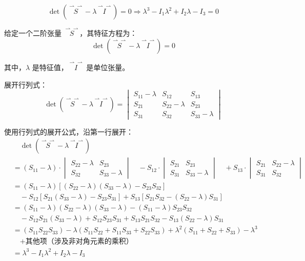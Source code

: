 \documentclass[12pt, a4paper, oneside, UTF8]{ctexbook}  %
\newcommand{\vvec}{\overset{\rightharpoonup\!\!\!\! \rightharpoonup}}
\begin{document}
\begin{lemma}
    \[\det\left(\vvec{S}-\lambda\vvec{I}\right)=0\Rightarrow
    \lambda^3-I_1\lambda^2+I_2\lambda-I_3=0\]
    \begin{tui}
        给定一个二阶张量 \(\vvec{S}\)，其特征方程为：
        \[
        \det\left(\vvec{S} - \lambda \vvec{I}\right) = 0
        \]
        
        其中，\(\lambda\) 是特征值，\(\vvec{I}\) 是单位张量。
        
        展开行列式：
        \[
        \det\left(\vvec{S} - \lambda \vvec{I}\right) = 
        \begin{vmatrix}
        S_{11} - \lambda & S_{12} & S_{13} \\
        S_{21} & S_{22} - \lambda & S_{23} \\
        S_{31} & S_{32} & S_{33} - \lambda
        \end{vmatrix}
        \]
        
        使用行列式的展开公式，沿第一行展开：
        \begin{align*}
        &\quad\det\left(\vvec{S} - \lambda \vvec{I}\right)\\
        &= (S_{11} - \lambda) \cdot 
        \begin{vmatrix}
        S_{22} - \lambda & S_{23} \\
        S_{32} & S_{33} - \lambda
        \end{vmatrix} 
        \quad - S_{12} \cdot 
        \begin{vmatrix}
        S_{21} & S_{23} \\
        S_{31} & S_{33} - \lambda
        \end{vmatrix} 
        \quad + S_{13} \cdot 
        \begin{vmatrix}
        S_{21} & S_{22} - \lambda \\
        S_{31} & S_{32}
        \end{vmatrix}\\
        &=(S_{11} - \lambda) \left[ (S_{22} - \lambda)(S_{33} - \lambda) - S_{23} S_{32} \right] \\
        &\quad - S_{12} \left[ S_{21} (S_{33} - \lambda) - S_{23} S_{31} \right] 
         + S_{13} \left[ S_{21} S_{32} - (S_{22} - \lambda) S_{31} \right]\\
        &=(S_{11} - \lambda)(S_{22} - \lambda)(S_{33} - \lambda)
         - (S_{11} - \lambda) S_{23} S_{32} \\
        &\quad - S_{12} S_{21} (S_{33} - \lambda) + S_{12} S_{23} S_{31} 
        + S_{13} S_{21} S_{32} - S_{13} (S_{22} - \lambda) S_{31}\\
        &=(S_{11} S_{22} S_{33}) 
        - \lambda (S_{11} S_{22} + S_{11} S_{33} + S_{22} S_{33}) 
        + \lambda^2 (S_{11} + S_{22} + S_{33})  - \lambda^3 \\
        &\quad+ \text{其他项（涉及非对角元素的乘积）}\\
        &=\lambda^3 - I_1 \lambda^2 + I_2 \lambda - I_3
        \end{align*}
        \end{tui}
\end{lemma}
\end{document}
